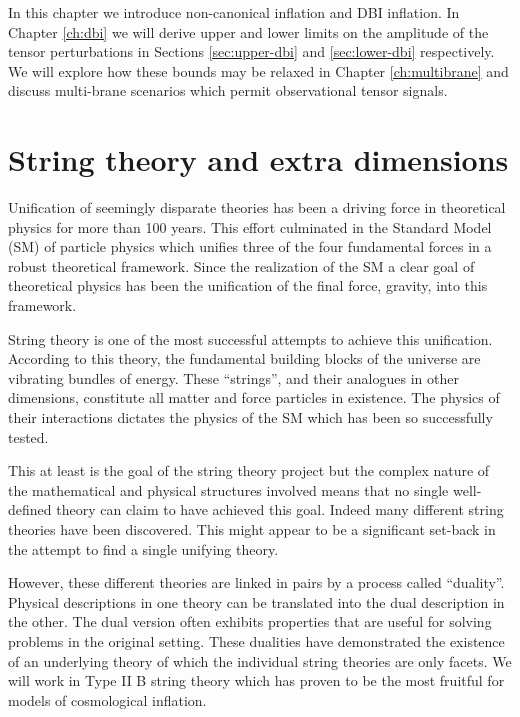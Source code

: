 In this chapter we introduce non-canonical inflation and DBI inflation.
In Chapter \ref{ch:dbi} we will derive upper and lower 
limits on the amplitude of the tensor perturbations in Sections \ref{sec:upper-dbi} and  
\ref{sec:lower-dbi} respectively.  
We will explore how these bounds may be relaxed in Chapter \ref{ch:multibrane} and discuss multi-brane 
scenarios which permit observational tensor signals. 

\section{String theory and extra dimensions}
\label{sec:extradims}
Unification of seemingly disparate theories has been a driving force in
theoretical physics for more than 100 years. This effort culminated in the
Standard Model (SM) of particle physics which unifies three of the four
fundamental forces in a robust theoretical framework. Since the realization of
the SM a clear goal of theoretical physics has been the unification of the
final force, gravity, into this framework.


String theory is one of the most successful attempts to achieve this
unification. According to this theory, the fundamental building blocks of the
universe are vibrating bundles of energy. These ``strings'', and their analogues
in other dimensions, constitute all matter and force particles in existence.
The physics of their interactions dictates the physics of the SM which has been
so successfully tested.

This at least is the goal of the string theory project but the complex nature
of the mathematical and physical structures involved means that no single
well-defined theory can claim to have achieved this goal. Indeed many different
string theories have been discovered. This might appear to be a significant
set-back in the attempt to find a single unifying theory. 

However, these different theories are linked in pairs by a process called
``duality''. Physical descriptions in one theory can be translated into the
dual description in the other. The dual version often exhibits properties that
are useful for solving problems in the original setting.
These dualities have demonstrated the existence of an underlying theory of
which the individual string theories are only facets. 
We will work in Type II B string theory which has proven to be the most
fruitful for models of cosmological inflation.

